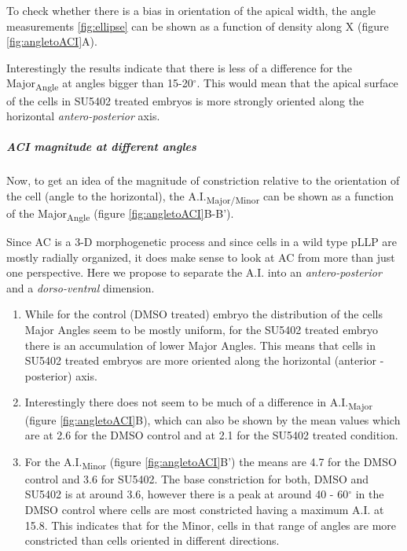 \documentclass[10pt, b5paper, singlespacinge, twoside]{reedthesis} %
\theoremstyle{definition}
\theoremstyle{definition}
\theoremstyle{definition}
\theoremstyle{remark}
\begin{document}
To check whether there is a bias in orientation of the apical width, the angle measurements \ref{fig:ellipse} can be shown as a function of density along X (figure \ref{fig:angletoACI}A).

Interestingly the results indicate that there is less of a difference for the Major\textsubscript{Angle} at angles bigger than 15-20\(^\circ\). This would mean that the apical surface of the cells in SU5402 treated embryos is more strongly oriented along the horizontal \emph{antero-posterior} axis.

\hypertarget{ACI-mag}{%
\subparagraph{ACI magnitude at different angles}\label{ACI-mag}}

Now, to get an idea of the magnitude of constriction relative to the orientation of the cell (angle to the horizontal), the A.I.\textsubscript{Major/Minor} can be shown as a function of the Major\textsubscript{Angle} (figure \ref{fig:angletoACI}B-B').

\noindent Since AC is a 3-D morphogenetic process and since cells in a wild type pLLP are mostly radially organized, it does make sense to look at AC from more than just one perspective. Here we propose to separate the A.I. into an \emph{antero-posterior} and a \emph{dorso-ventral} dimension.
\begin{enumerate}
\def\labelenumi{\arabic{enumi}.}
\item
  While for the control (DMSO treated) embryo the distribution of the cells Major Angles seem to be mostly uniform, for the SU5402 treated embryo there is an accumulation of lower Major Angles. This means that cells in SU5402 treated embryos are more oriented along the horizontal (anterior - posterior) axis.
\item
  Interestingly there does not seem to be much of a difference in A.I.\textsubscript{Major} (figure \ref{fig:angletoACI}B), which can also be shown by the mean values which are at 2.6 for the DMSO control and at 2.1 for the SU5402 treated condition.
\item
  For the A.I.\textsubscript{Minor} (figure \ref{fig:angletoACI}B') the means are 4.7 for the DMSO control and 3.6 for SU5402. The base constriction for both, DMSO and SU5402 is at around 3.6, however there is a peak at around 40 - 60\(^\circ\) in the DMSO control where cells are most constricted having a maximum A.I. at 15.8. This indicates that for the Minor, cells in that range of angles are more constricted than cells oriented in different directions.
\end{enumerate}
\end{document}
